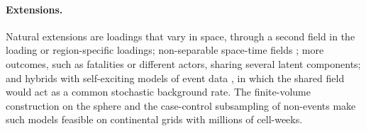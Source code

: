 \paragraph{Extensions.} Natural extensions are loadings that vary in space, through a
second field in the loading or region-specific loadings; non-separable space-time
fields \citep{lindgren2024diffusion}; more outcomes, such as fatalities or different
actors, sharing several latent components; and hybrids with self-exciting models of
event data \citep{jun2024hawkes, browning2026hawkes}, in which the shared field would
act as a common stochastic background rate. The finite-volume construction on the
sphere and the case-control subsampling of non-events make such models feasible on
continental grids with millions of cell-weeks.
